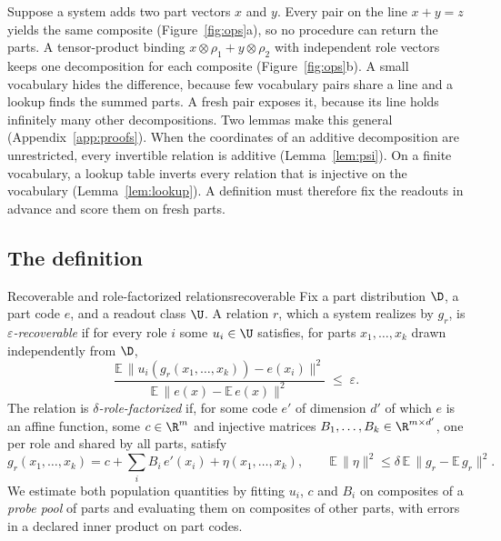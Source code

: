 Suppose a system adds two part vectors $x$ and $y$. Every pair on the line $x + y = z$ yields the same composite (Figure~\ref{fig:ops}a), so no procedure can return the parts. A tensor-product binding $x \otimes \rho_1 + y \otimes \rho_2$ with independent role vectors keeps one decomposition for each composite (Figure~\ref{fig:ops}b). A small vocabulary hides the difference, because few vocabulary pairs share a line and a lookup finds the summed parts. A fresh pair exposes it, because its line holds infinitely many other decompositions. Two lemmas make this general (Appendix~\ref{app:proofs}). When the coordinates of an additive decomposition are unrestricted, every invertible relation is additive (Lemma~\ref{lem:psi}). On a finite vocabulary, a lookup table inverts every relation that is injective on the vocabulary (Lemma~\ref{lem:lookup}). A definition must therefore fix the readouts in advance and score them on fresh parts.

\subsection{The definition}

\begin{defbox}{Recoverable and role-factorized relations}{recoverable}
Fix a part distribution $\D$, a part code $e$, and a readout class $\U$. A relation $r$, which a system realizes by $g_r$, is \emph{$\varepsilon$-recoverable} if for every role $i$ some $u_i \in \U$ satisfies, for parts $x_1, \ldots, x_k$ drawn independently from $\D$,
\begin{equation}
  \frac{\mathbb{E}\,\lVert u_i(g_r(x_1,\ldots,x_k)) - e(x_i) \rVert^2}{\mathbb{E}\,\lVert e(x) - \mathbb{E}\,e(x) \rVert^2} \;\le\; \varepsilon .
  \label{eq:recover}
\end{equation}
The relation is \emph{$\delta$-role-factorized} if, for some code $e'$ of dimension $d'$ of which $e$ is an affine function, some $c \in \R^m$ and injective matrices $B_1, \ldots, B_k \in \R^{m \times d'}$, one per role and shared by all parts, satisfy
\begin{equation}
  g_r(x_1, \ldots, x_k) = c + \textstyle\sum_{i} B_i\, e'(x_i) + \eta(x_1, \ldots, x_k), \qquad \mathbb{E}\,\lVert \eta \rVert^2 \le \delta\, \mathbb{E}\,\lVert g_r - \mathbb{E}\,g_r \rVert^2 .
  \label{eq:factor}
\end{equation}
We estimate both population quantities by fitting $u_i$, $c$ and $B_i$ on composites of a \emph{probe pool} of parts and evaluating them on composites of other parts, with errors in a declared inner product on part codes.
\end{defbox}

